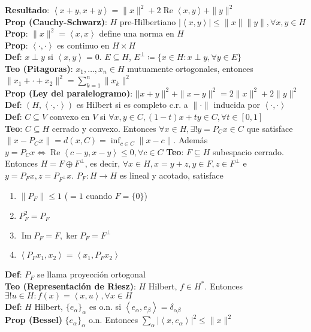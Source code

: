 \documentclass[9pt]{extarticle}
\newcommand{\inn}[1]{\left\langle #1\right\rangle}
\begin{document}
\begin{multicols*}{2}
\textbf{Resultado}: $\inn{x+y,x+y}=\|x\|^2+2\operatorname{Re}\inn{x,y}+\|y\|^2$\\
\textbf{Prop (Cauchy-Schwarz)}: $H$ pre-Hilbertiano $|\inn{x,y}|\leq \|x\|\|y\|,\forall x,y\in H$\\
\textbf{Prop}: $\|x\|^2=\inn{x,x}$ define una norma en $H$\\
\textbf{Prop}: $\inn{\cdot,\cdot}$ es continuo en $H\times H$\\
\textbf{Def}: $x\perp y$ si $\inn{x,y}=0$. $E\subseteq H$, $E^\perp\coloneqq \{x\in H:x\perp y,\forall y\in E\}$\\
\textbf{Teo (Pitagoras)}: $x_1,\ldots,x_n\in H$ mutuamente ortogonales, entonces $\|x_1+\cdot+x_2\|^2=\sum_{k=1}^n \|x_k\|^2$\\
\textbf{Prop (Ley del paralelogramo)}: $||x+y\|^2+\|x-y\|^2=2\|x\|^2+2\|y\|^2$\\
\textbf{Def}: $(H,\inn{\cdot,\cdot})$ es Hilbert si es completo c.r. a $\|\cdot\|$ inducida por $\inn{\cdot,\cdot}$\\
\textbf{Def}: $C\subseteq V$ convexo en $V$ si $\forall x,y\in C,(1-t)x+ty\in C,\forall t\in [0,1]$\\
\textbf{Teo}: $C\subseteq H$ cerrado y convexo. Entonces $\forall x\in H,\exists!y=P_Cx\in C$ que satisface $\|x-P_Cx\|=d(x,C)=\inf_{c\in C}\|x-c\|$. Además $y=P_C x\iff \operatorname{Re}\inn{c-y,x-y}\leq 0,\forall c\in C$
\textbf{Teo}: $F\subseteq H$ subespacio cerrado. Entonces $H=F\oplus F^\perp$, es decir, $\forall x\in H, x=y+z,y\in F,z\in F^\perp$ e $y=P_Fx,z=P_{F^\perp}x$. $P_F:H\to H$ es lineal y acotado, satisface
\begin{enumerate}
	\item $\|P_F\|\leq 1$ ($=1$ cuando $F=\{0\}$)
	\item $P_F^2=P_F$
	\item $\operatorname{Im} P_F=F,\ker P_F=F^\perp$
	\item $\inn{P_Fx_1,x_2}=\inn{x_1,P_F x_2}$
\end{enumerate}
\textbf{Def}: $P_F$ se llama proyección ortogonal\\
\textbf{Teo (Representación de Riesz)}: $H$ Hilbert, $f\in H^*$. Entonces $\exists!u\in H:f(x)=\inn{x,u},\forall x\in H$\\
\textbf{Def}: $H$ Hilbert, $\{e_\alpha\}_\alpha$ es o.n. si $\inn{e_\alpha,e_\beta}=\delta_{\alpha\beta}$\\
\textbf{Prop (Bessel)} $\{e_\alpha\}_\alpha$ o.n. Entonces $\sum_\alpha |\inn{x,e_\alpha}|^2\leq \|x\|^2$\\

\end{multicols*}
\end{document}
